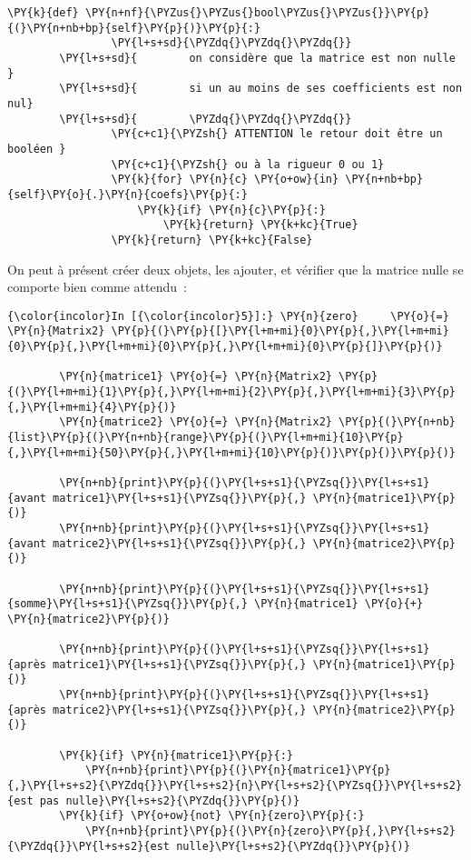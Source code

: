 \begin{Verbatim}[commandchars=\\\{\},frame=single,framerule=0.3mm,rulecolor=\color{cellframecolor}]
            \PY{k}{def} \PY{n+nf}{\PYZus{}\PYZus{}bool\PYZus{}\PYZus{}}\PY{p}{(}\PY{n+nb+bp}{self}\PY{p}{)}\PY{p}{:}
                \PY{l+s+sd}{\PYZdq{}\PYZdq{}\PYZdq{}}
        \PY{l+s+sd}{        on considère que la matrice est non nulle }
        \PY{l+s+sd}{        si un au moins de ses coefficients est non nul}
        \PY{l+s+sd}{        \PYZdq{}\PYZdq{}\PYZdq{}}
                \PY{c+c1}{\PYZsh{} ATTENTION le retour doit être un booléen }
                \PY{c+c1}{\PYZsh{} ou à la rigueur 0 ou 1}
                \PY{k}{for} \PY{n}{c} \PY{o+ow}{in} \PY{n+nb+bp}{self}\PY{o}{.}\PY{n}{coefs}\PY{p}{:}
                    \PY{k}{if} \PY{n}{c}\PY{p}{:}
                        \PY{k}{return} \PY{k+kc}{True}
                \PY{k}{return} \PY{k+kc}{False}
\end{Verbatim}


    On peut à présent créer deux objets, les ajouter, et vérifier que la
matrice nulle se comporte bien comme attendu~:

    \begin{Verbatim}[commandchars=\\\{\},frame=single,framerule=0.3mm,rulecolor=\color{cellframecolor}]
{\color{incolor}In [{\color{incolor}5}]:} \PY{n}{zero}     \PY{o}{=} \PY{n}{Matrix2} \PY{p}{(}\PY{p}{[}\PY{l+m+mi}{0}\PY{p}{,}\PY{l+m+mi}{0}\PY{p}{,}\PY{l+m+mi}{0}\PY{p}{,}\PY{l+m+mi}{0}\PY{p}{]}\PY{p}{)}
        
        \PY{n}{matrice1} \PY{o}{=} \PY{n}{Matrix2} \PY{p}{(}\PY{l+m+mi}{1}\PY{p}{,}\PY{l+m+mi}{2}\PY{p}{,}\PY{l+m+mi}{3}\PY{p}{,}\PY{l+m+mi}{4}\PY{p}{)}
        \PY{n}{matrice2} \PY{o}{=} \PY{n}{Matrix2} \PY{p}{(}\PY{n+nb}{list}\PY{p}{(}\PY{n+nb}{range}\PY{p}{(}\PY{l+m+mi}{10}\PY{p}{,}\PY{l+m+mi}{50}\PY{p}{,}\PY{l+m+mi}{10}\PY{p}{)}\PY{p}{)}\PY{p}{)}
        
        \PY{n+nb}{print}\PY{p}{(}\PY{l+s+s1}{\PYZsq{}}\PY{l+s+s1}{avant matrice1}\PY{l+s+s1}{\PYZsq{}}\PY{p}{,} \PY{n}{matrice1}\PY{p}{)}
        \PY{n+nb}{print}\PY{p}{(}\PY{l+s+s1}{\PYZsq{}}\PY{l+s+s1}{avant matrice2}\PY{l+s+s1}{\PYZsq{}}\PY{p}{,} \PY{n}{matrice2}\PY{p}{)}
        
        \PY{n+nb}{print}\PY{p}{(}\PY{l+s+s1}{\PYZsq{}}\PY{l+s+s1}{somme}\PY{l+s+s1}{\PYZsq{}}\PY{p}{,} \PY{n}{matrice1} \PY{o}{+} \PY{n}{matrice2}\PY{p}{)}
        
        \PY{n+nb}{print}\PY{p}{(}\PY{l+s+s1}{\PYZsq{}}\PY{l+s+s1}{après matrice1}\PY{l+s+s1}{\PYZsq{}}\PY{p}{,} \PY{n}{matrice1}\PY{p}{)}
        \PY{n+nb}{print}\PY{p}{(}\PY{l+s+s1}{\PYZsq{}}\PY{l+s+s1}{après matrice2}\PY{l+s+s1}{\PYZsq{}}\PY{p}{,} \PY{n}{matrice2}\PY{p}{)}
        
        \PY{k}{if} \PY{n}{matrice1}\PY{p}{:} 
            \PY{n+nb}{print}\PY{p}{(}\PY{n}{matrice1}\PY{p}{,}\PY{l+s+s2}{\PYZdq{}}\PY{l+s+s2}{n}\PY{l+s+s2}{\PYZsq{}}\PY{l+s+s2}{est pas nulle}\PY{l+s+s2}{\PYZdq{}}\PY{p}{)}
        \PY{k}{if} \PY{o+ow}{not} \PY{n}{zero}\PY{p}{:} 
            \PY{n+nb}{print}\PY{p}{(}\PY{n}{zero}\PY{p}{,}\PY{l+s+s2}{\PYZdq{}}\PY{l+s+s2}{est nulle}\PY{l+s+s2}{\PYZdq{}}\PY{p}{)}
\end{Verbatim}



